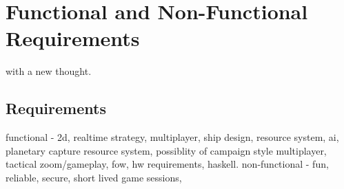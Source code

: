 \chapter[Functional and Non-Functional Requirements]{Functional and Non-Functional Requirements}
\label{ch:requirements}


 with a new thought.

\section{Requirements}
functional - 2d, realtime strategy, multiplayer, ship design, resource system, ai, planetary capture resource system, possiblity of campaign style multiplayer, tactical zoom/gameplay, fow, hw requirements, haskell.
non-functional - fun, reliable, secure, short lived game sessions, 